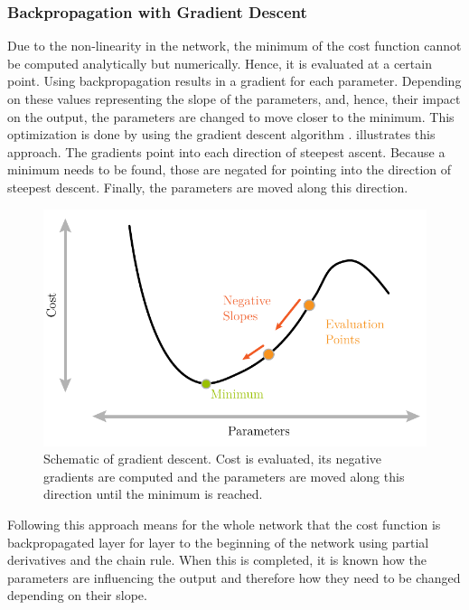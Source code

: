 \subsubsection{Backpropagation with Gradient Descent}
\label{sec:training-gradient-descent}
Due to the non-linearity in the network, the minimum of the cost function cannot be computed analytically but numerically.
Hence, it is evaluated at a certain point.
Using backpropagation \cite{rumelhart1986learning} \cite{Goodfellow-et-al-2016} results in a gradient for each parameter.
Depending on these values representing the slope of the parameters, and, hence, their impact on the output, the parameters are changed to move closer to the minimum.
This optimization is done by using the gradient descent algorithm \cite{kiefer1952} \cite{robbins1951}.
 illustrates this approach.
The gradients point into each direction of steepest ascent.
Because a minimum needs to be found, those are negated for pointing into the direction of steepest descent.
Finally, the parameters are moved along this direction.
\begin{figure}
	\centering
	\includegraphics{images/gradient_descent.pdf}
	\caption[Schematic of gradient descent]{Schematic of gradient descent. Cost is evaluated, its negative gradients are computed and the parameters are moved along this direction until the minimum is reached.}
	\label{fig:gradient-descent}
\end{figure}
Following this approach means for the whole network that the cost function is backpropagated layer for layer to the beginning of the network using partial derivatives and the chain rule.
When this is completed, it is known how the parameters are influencing the output and therefore how they need to be changed depending on their slope.

